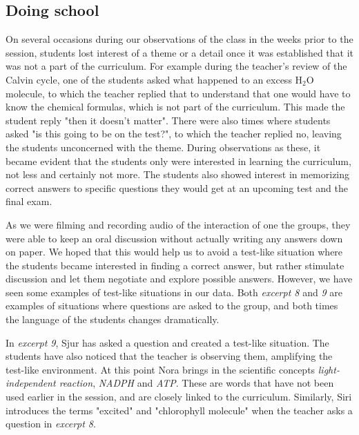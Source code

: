 \subsection{Doing school}

On several occasions during our observations of the class in the weeks prior to the session, students lost interest of a theme or a detail once it was established that it was not a part of the curriculum. For example during the teacher's review of the Calvin cycle, one of the students asked what happened to an excess $\text{H}_2\text{O}$ molecule, to which the teacher replied that to understand that one would have to know the chemical formulas, which is not part of the curriculum. This made the student reply "then it doesn't matter". There were also times where students asked "is this going to be on the test?", to which the teacher replied no, leaving the students unconcerned with the theme. During observations as these, it became evident that the students only were interested in learning the curriculum, not less and certainly not more. The students also showed interest in memorizing correct answers to specific questions they would get at an upcoming test and the final exam. 

As we were filming and recording audio of the interaction of one the groups, they were able to keep an oral discussion without actually writing any answers down on paper. We hoped that this would help us to avoid a test-like situation where the students became interested in finding a correct answer, but rather stimulate discussion and let them negotiate and explore possible answers. However, we have seen some examples of test-like situations in our data. Both \emph{excerpt 8} and \emph{9} are examples of situations where questions are asked to the group, and both times the language of the students changes dramatically. 

In \emph{excerpt 9}, Sjur has asked a question and created a test-like situation. The students have also noticed that the teacher is observing them, amplifying the test-like environment. At this point Nora brings in the scientific concepts \emph{light-independent reaction}, \emph{NADPH} and \emph{ATP}. These are words that have not been used earlier in the session, and are closely linked to the curriculum. Similarly, Siri introduces the terms "excited" and "chlorophyll molecule" when the teacher asks a question in \emph{excerpt 8}.

